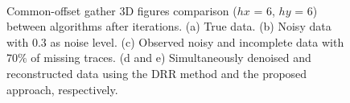 {%
\begin{figure}[htb!]
	\centering
	\\
	\caption{Common-offset gather 3D figures comparison ($hx$ = 6, $hy$ = 6) between  algorithms after  iterations. (a) True data. (b) Noisy data with $0.3$ as noise level. (c) Observed noisy and incomplete data with $70\%$ of missing traces. (d and e) Simultaneously denoised and reconstructed data using the DRR method and the proposed approach, respectively.}
	\label{synth-clean-xy,synth-noisy-xy,synth-obs-xy,synth-drr-xy,synth-rdrr-xy}
\end{figure}%
}
